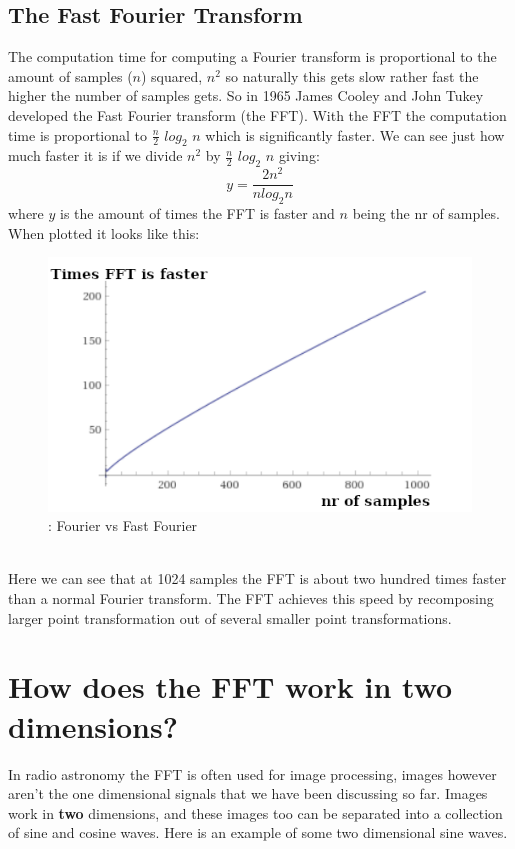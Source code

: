 \documentclass[11pt, A4, oneside]{article}
\begin{document}
\subsection{The Fast Fourier Transform}
The computation time for computing a Fourier transform is proportional to the amount of samples (\(n\)) squared, \(n^2\) so naturally this gets slow rather fast the higher the number of samples gets. So in 1965 James Cooley and John Tukey developed the Fast Fourier transform (the FFT). With the FFT the computation time is proportional to \(\frac{n}{2}\) \(log_{2}\) \(n\) \cite{Sig} which is significantly faster.
We can see just how much faster it is if we divide \(n^2\) by \(\frac{n}{2}\) \(log_{2}\) \(n\) giving: \[y = \frac{2 n^2}{n log_{2} n}\] where \(y\) is the amount of times the FFT is faster and \(n\) being the nr of samples. When plotted it looks like this:
\begin{figure}[!ht]
	\centering
	\includegraphics[width=\linewidth]{fft_tegen_ft}
	\caption{: Fourier vs Fast Fourier}
	\label{fourier_vs_fft}
\end{figure}\\
Here we can see that at 1024 samples the FFT is about two hundred times faster than a normal Fourier transform.
The FFT achieves this speed by recomposing larger point transformation out of several smaller point transformations. 

\section{How does the FFT work in two dimensions?} 
In radio astronomy the FFT is often used for image processing, images however aren't the one dimensional signals that we have been discussing so far. Images work in \textbf{two} dimensions, and these images too can be separated into a collection of sine and cosine waves. Here is an example of some two dimensional sine waves. 
\end{document}
